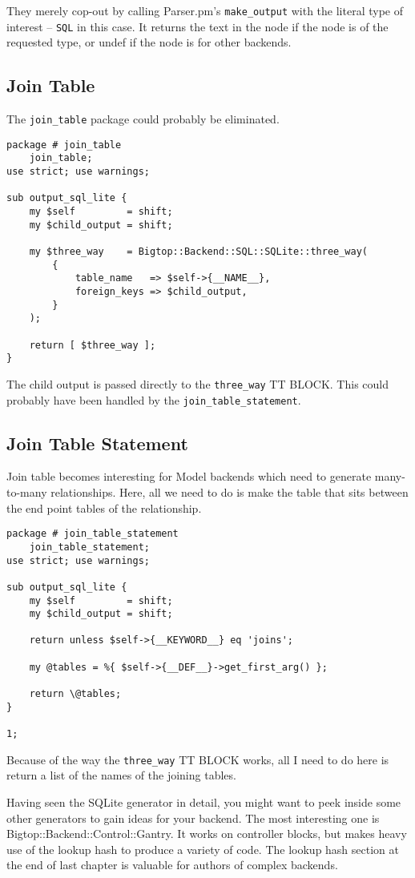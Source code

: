 They merely cop-out by calling Parser.pm's \verb+make_output+ with the
literal type of interest -- \verb+SQL+ in this case.  It returns the text
in the node if the node is of the requested type, or undef if the node
is for other backends.

\subsection*{Join Table}

The \verb+join_table+ package could probably be eliminated.

\begin{verbatim}
package # join_table
    join_table;
use strict; use warnings;

sub output_sql_lite {
    my $self         = shift;
    my $child_output = shift;

    my $three_way    = Bigtop::Backend::SQL::SQLite::three_way(
        {
            table_name   => $self->{__NAME__},
            foreign_keys => $child_output,
        }
    );

    return [ $three_way ];
}
\end{verbatim}

The child output is passed directly to the \verb+three_way+ TT BLOCK.
This could probably have been handled by the \verb+join_table_statement+.

\subsection*{Join Table Statement}

Join table becomes interesting for Model backends which need to generate
many-to-many relationships.  Here, all we need to do is make the table that
sits between the end point tables of the relationship.

\begin{verbatim}
package # join_table_statement
    join_table_statement;
use strict; use warnings;

sub output_sql_lite {
    my $self         = shift;
    my $child_output = shift;

    return unless $self->{__KEYWORD__} eq 'joins';

    my @tables = %{ $self->{__DEF__}->get_first_arg() };

    return \@tables;
}

1;
\end{verbatim}

Because of the way the \verb+three_way+ TT BLOCK works, all I need
to do here is return a list of the names of the joining tables.

Having seen the SQLite generator in detail, you might want to peek inside
some other generators to gain ideas for your backend.  The most interesting
one is Bigtop::Backend::Control::Gantry.  It works on controller blocks,
but makes heavy use of the lookup hash to produce a variety of code.
The lookup hash section at the end of last chapter is valuable for authors
of complex backends.
